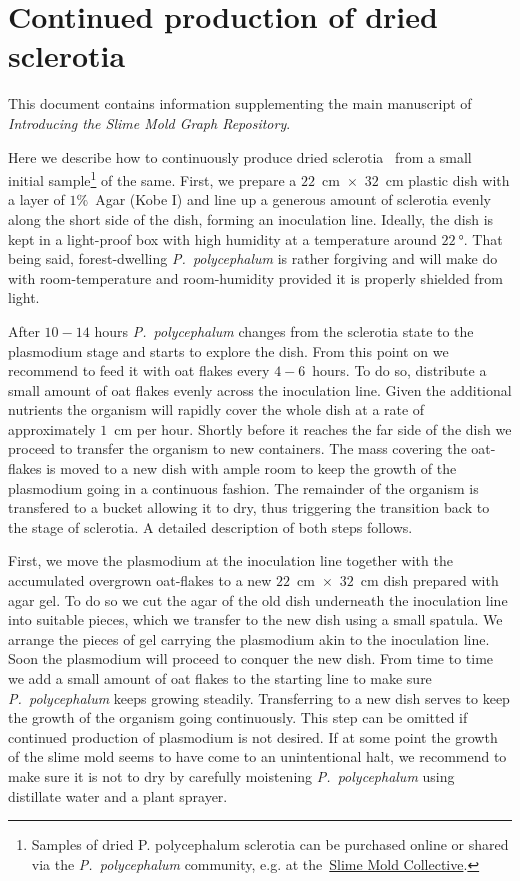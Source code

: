 
\chapter{Continued production of dried sclerotia}

	This document contains information supplementing the main manuscript of \emph{Introducing the Slime Mold Graph Repository}.

	Here we describe how to continuously produce dried sclerotia~\cite{lifecycle} from a small initial sample\footnote{Samples of dried P. polycephalum sclerotia can be purchased online or shared via the \emph{P.~polycephalum} community, e.g. at the~\href{http://slimoco.ning.com/}{Slime Mold Collective}.} of the same. First, we prepare a $22$~cm~$\times$~$32$~cm plastic dish with a layer of $1 \%$~Agar (Kobe I) and line up a generous amount of sclerotia evenly along the short side of the dish, forming an inoculation line. Ideally, the dish is kept in a light-proof box with high humidity at a temperature around $\SI{22}{\degree}$. That being said, forest-dwelling \emph{P.~polycephalum} is rather forgiving and will make do with room-temperature and room-humidity provided it is properly shielded from light.

	After $10-14$ hours \emph{P.~polycephalum} changes from the sclerotia state to the plasmodium stage and starts to explore the dish. From this point on we recommend to feed it with oat flakes every $4-6$~hours. To do so, distribute a small amount of oat flakes evenly across the inoculation line. Given the additional nutrients the organism will rapidly cover the whole dish at a rate of approximately $1$~cm per hour. Shortly before it reaches the far side of the dish we proceed to transfer the organism to new containers. The mass covering the oat-flakes is moved to a new dish with ample room to keep the growth of the plasmodium going in a continuous fashion. The remainder of the organism is transfered to a bucket allowing it to dry, thus triggering the transition back to the stage of sclerotia. A detailed description of both steps follows.

	First, we move the plasmodium at the inoculation line together with the accumulated overgrown oat-flakes to a new $22$~cm~$\times$~$32$~cm dish prepared with agar gel. To do so we cut the agar of the old dish underneath the inoculation line into suitable pieces, which we transfer to the new dish using a small spatula. We arrange the pieces of gel carrying the plasmodium akin to the inoculation line. Soon the plasmodium will proceed to conquer the new dish. From time to time we add a small amount of oat flakes to the starting line to make sure \emph{P.~polycephalum} keeps growing steadily. Transferring to a new dish serves to keep the growth of the organism going continuously. This step can be omitted if continued production of plasmodium is not desired. If at some point the growth of the slime mold seems to have come to an unintentional halt, we recommend to make sure it is not to dry by carefully moistening \emph{P.~polycephalum} using distillate water and a plant sprayer.

